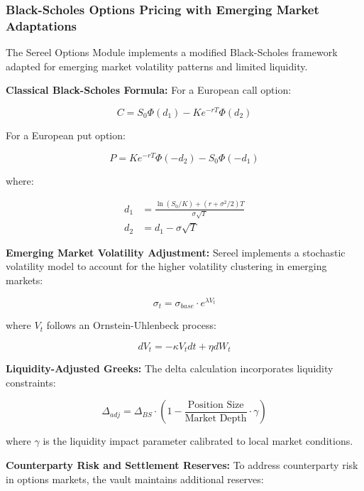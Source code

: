 \documentclass[12pt]{article}
\begin{document}
\subsubsection{Black-Scholes Options Pricing with Emerging Market Adaptations}

The Sereel Options Module implements a modified Black-Scholes framework adapted for emerging market volatility patterns and limited liquidity.

\textbf{Classical Black-Scholes Formula:}
For a European call option:

\begin{equation}
C = S_0 \Phi(d_1) - K e^{-rT} \Phi(d_2)
\end{equation}

For a European put option:

\begin{equation}
P = K e^{-rT} \Phi(-d_2) - S_0 \Phi(-d_1)
\end{equation}

where:

\begin{align}
d_1 &= \frac{\ln(S_0/K) + (r + \sigma^2/2)T}{\sigma\sqrt{T}} \\
d_2 &= d_1 - \sigma\sqrt{T}
\end{align}

\textbf{Emerging Market Volatility Adjustment:}
Sereel implements a stochastic volatility model to account for the higher volatility clustering in emerging markets:

\begin{equation}
\sigma_t = \sigma_{base} \cdot e^{\lambda V_t}
\end{equation}

where $V_t$ follows an Ornstein-Uhlenbeck process:

\begin{equation}
dV_t = -\kappa V_t dt + \eta dW_t
\end{equation}

\textbf{Liquidity-Adjusted Greeks:}
The delta calculation incorporates liquidity constraints:

\begin{equation}
\Delta_{adj} = \Delta_{BS} \cdot \left(1 - \frac{\text{Position Size}}{\text{Market Depth}} \cdot \gamma\right)
\end{equation}

where $\gamma$ is the liquidity impact parameter calibrated to local market conditions.

\textbf{Counterparty Risk and Settlement Reserves:}
To address counterparty risk in options markets, the vault maintains additional reserves:
\end{document}
